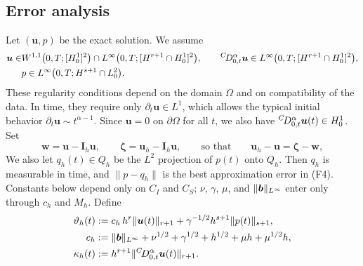 \subsection{Error analysis}


Let $(\bm u,p)$ be the exact solution. We assume
\begin{align}\label{sec:error}
\bm u\in & W^{1,1}\bigl(0,T;[H^1_0]^2\bigr)\cap L^\infty\bigl(0,T;[H^{r+1}\cap H^1_0]^2\bigr),\qquad
{}^{C}\!D_{0,t}^{\alpha}\bm u\in L^\infty\bigl(0,T;[H^{r+1}\cap H^1_0]^2\bigr),\nonumber \\
&p\in L^\infty\bigl(0,T;H^{s+1}\cap L^2_0\bigr).
\end{align}
These regularity conditions depend on the domain $\Omega$ and on compatibility of the data. In time, they require only $\partial_t\bm u\in L^1$, which allows the typical initial behavior $\partial_t\bm u\sim t^{\alpha-1}$. Since $\bm u=0$ on $\partial\Omega$ for all $t$, we also have ${}^{C}\!D_{0,t}^{\alpha}\bm u(t)\in H^1_0$. Set
\[
\bm w=\bm u-\bm I_h\bm u,\qquad \bm\zeta=\bm u_h-\bm I_h\bm u,\qquad\text{so that}\qquad \bm u_h-\bm u=\bm\zeta-\bm w ,
\]
We also let $q_h(t)\in Q_h$ be the $L^2$ projection of $p(t)$ onto $Q_h$. Then $q_h$ is measurable in time, and $\|p-q_h\|$ is the best approximation error in (F4). Constants below depend only on $C_I$ and $C_S$; $\nu$, $\gamma$, $\mu$, and $\|\boldsymbol b\|_{L^\infty}$ enter only through $c_h$ and $M_h$. Define
\begin{equation}\label{eq:vartheta}
\begin{aligned}
\vartheta_h(t)&:=c_h\,h^r\|\bm u(t)\|_{r+1}+\gamma^{-1/2}h^{s+1}\|p(t)\|_{s+1},\\
c_h&:=\|\boldsymbol b\|_{L^\infty}+\nu^{1/2}+\gamma^{1/2}+h^{1/2}+\mu h+\mu^{1/2}h,\\
\kappa_h(t)&:=h^{r+1}\|{}^{C}\!D_{0,t}^{\alpha}\bm u(t)\|_{r+1}.
\end{aligned}
\end{equation}

